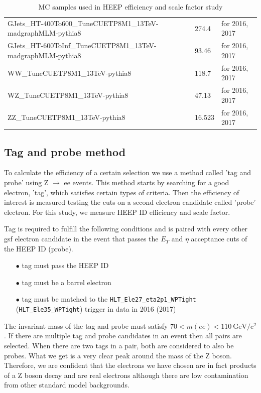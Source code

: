 \begin{table}[htp]
\begin{center}
{\begin{tabular}{|l|l|l|}
GJets\_HT-400To600\_TuneCUETP8M1\_13TeV-madgraphMLM-pythia8             & 274.4   & for 2016, 2017        \\
GJets\_HT-600ToInf\_TuneCUETP8M1\_13TeV-madgraphMLM-pythia8             & 93.46   & for 2016, 2017         \\
\hline
WW\_TuneCUETP8M1\_13TeV-pythia8                                         & 118.7   & for 2016, 2017         \\
WZ\_TuneCUETP8M1\_13TeV-pythia8                                         & 47.13   & for 2016, 2017         \\
ZZ\_TuneCUETP8M1\_13TeV-pythia8                                         & 16.523  & for 2016, 2017         \\
\hline
\end{tabular}}
\caption{MC samples used in HEEP efficiency and scale factor study}
\label{tab:HEEPSF-samples}
  \end{center}
\end{table}


\subsection{Tag and probe method}
\label{subsubsec:Same_sign_method}
To calculate the efficiency of a certain selection we use a method called 'tag and probe' using Z $\rightarrow$ ee events. This method starts by searching for a good electron, 'tag', which satisfies certain types of criteria. Then the efficiency of interest is measured testing the cuts on a second electron candidate called 'probe' electron. For this study, we measure HEEP ID efficiency and scale factor.

Tag is required to fulfill the following conditions and is paired with every other gsf electron candidate in the event that passes the $E_{T}$ and $\eta$ acceptance cuts of the HEEP ID (probe).
\begin{itemize}
  \item[$\bullet$] tag must pass the HEEP ID
  \item[$\bullet$] tag must be a barrel electron
  \item[$\bullet$] tag must be matched to the \texttt{HLT\_Ele27\_eta2p1\_WPTight} (\texttt{HLT\_Ele35\_WPTight}) trigger in data in 2016 (2017)
\end{itemize}
The invariant mass of the tag and probe must satisfy $70 < m(ee) < 110 ~\mathrm{GeV/c^{2}}$. If there are multiple tag and probe candidates in an event then all pairs are selected.
When there are two tags in a pair, both are considered to also be probes.
What we get is a very clear peak around the mass of the Z boson.
Therefore, we are confident that the electrons we have chosen are in fact products of a Z boson decay and are real electrons although there are low contamination from other standard model backgrounds.

